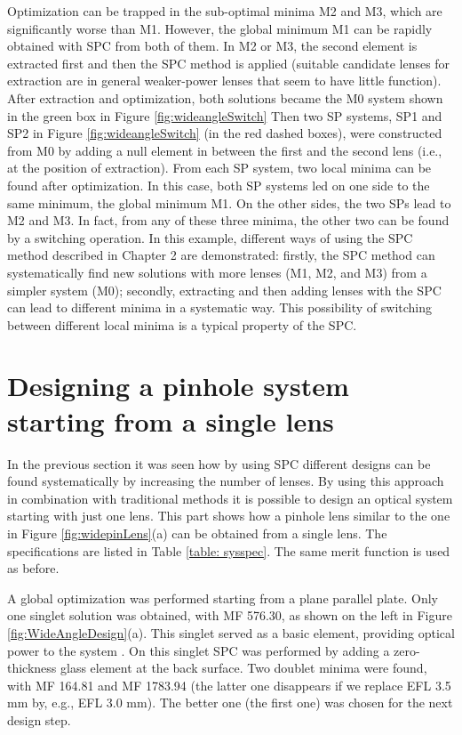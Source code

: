 Optimization can be trapped in the sub-optimal minima M2 and M3, which are significantly worse than M1. However, the global minimum M1 can be rapidly obtained with SPC from both of them. In M2 or M3, the second element is extracted first and then the SPC method is applied (suitable candidate lenses for extraction are in general weaker-power lenses that seem to have little function). After extraction and optimization, both solutions became the M0 system shown in the green box in Figure \ref{fig:wideangleSwitch} Then two SP systems, SP1 and SP2 in Figure \ref{fig:wideangleSwitch} (in the red dashed boxes), were constructed from M0 by adding a null element in between the first and the second lens (i.e., at the position of extraction). From each SP system, two local minima can be found after optimization. In this case, both SP systems led on one side to the same minimum, the global minimum M1. On the other sides, the two SPs lead to M2 and M3. In fact, from any of these three minima, the other two can be found by a switching operation. In this example, different ways of using the SPC method described in Chapter 2 are demonstrated: firstly, the SPC method can systematically find new solutions with more lenses (M1, M2, and M3) from a simpler system (M0); secondly, extracting and then adding lenses with the SPC can lead to different minima in a systematic way. This possibility of switching between different local minima is a typical property of the SPC.
\section{Designing a pinhole system starting from a single lens} \label{chrom90d}

In the previous section it was seen how by using SPC different designs can be found systematically by increasing the number of lenses. By using this approach in combination with traditional methods it is possible to design an optical system starting with just one lens. This part shows how a pinhole lens similar to the one in Figure \ref{fig:widepinLens}(a) can be obtained from a single lens. The specifications are listed in Table \ref{table: sysspec}. The same merit function is used as before.

A global optimization was performed starting from a plane parallel plate. Only one singlet solution was obtained, with MF 576.30, as shown on the left in Figure \ref{fig:WideAngleDesign}(a). This singlet served as a basic element, providing optical power to the system \cite{LivshitsQA2013}. On this singlet SPC was performed by adding a zero-thickness glass element at the back surface. Two doublet minima were found, with MF 164.81 and MF 1783.94 (the latter one disappears if we replace EFL 3.5 mm by, e.g., EFL 3.0 mm). The better one (the first one) was chosen for the next design step. 

